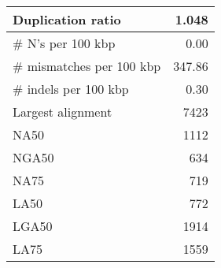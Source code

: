 \documentclass[12pt,a4paper]{article}
\begin{document}
\begin{table}[ht]
\begin{center}
\begin{tabular}{|l*{1}{|r}|}
Duplication ratio & 1.048 \\ \hline
\# N's per 100 kbp & 0.00 \\ \hline
\# mismatches per 100 kbp & 347.86 \\ \hline
\# indels per 100 kbp & 0.30 \\ \hline
Largest alignment & 7423 \\ \hline
NA50 & 1112 \\ \hline
NGA50 & 634 \\ \hline
NA75 & 719 \\ \hline
LA50 & 772 \\ \hline
LGA50 & 1914 \\ \hline
LA75 & 1559 \\ \hline
\end{tabular}
\end{center}
\end{table}
\end{document}
